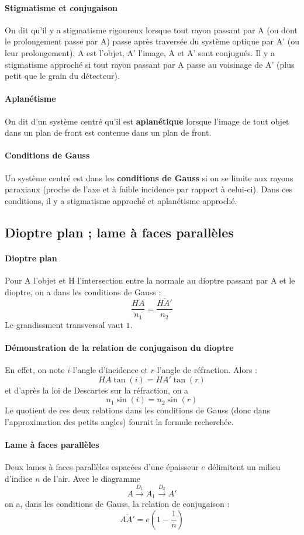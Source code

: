 \documentclass[french]{book}
\theoremstyle{plain}
\theoremstyle{definition}
\theoremstyle{remark}
\begin{document}
\paragraph{Stigmatisme et conjugaison}
On dit qu'il y a stigmatisme rigoureux lorsque tout rayon passant par A (ou dont le prolongement passe par A) passe après traversée du système optique par A' (ou leur prolongement). A est l’objet, A' l’image, A et A' sont conjugués. Il y a stigmatisme approché si tout rayon passant par A passe au voisinage de A' (plus petit que le grain du détecteur).
\paragraph{Aplanétisme} On dit d'un système centré qu'il est \textbf{aplanétique} lorsque l'image de tout objet dans un plan de front est contenue dans un plan de front.
\paragraph{Conditions de Gauss} Un système centré est dans les \textbf{conditions de Gauss} si on se limite aux rayons paraxiaux (proche de l’axe et à faible incidence par rapport à celui-ci). Dans ces conditions, il y a stigmatisme approché et aplanétisme approché.
\subsection{Dioptre plan ; lame à faces parallèles}
\paragraph{Dioptre plan} Pour A l’objet et H l’intersection entre la normale au dioptre passant par A et le dioptre, on a dans les conditions de Gauss : $$\frac{\overline{HA}}{n_1}=\frac{\overline{HA'}}{n_2}$$ Le grandissment transversal vaut $1$.
\paragraph{Démonstration de la relation de conjugaison du dioptre} En effet, on note $i$ l'angle d'incidence et $r$ l'angle de réfraction. Alors : $$HA\tan(i)=HA'\tan(r)$$ et d'après la loi de Descartes sur la réfraction, on a $$n_1\sin(i)=n_2\sin(r)$$ Le quotient de ces deux relations dans les conditions de Gauss (donc dans l'approximation des petits angles) fournit la formule recherchée.
\paragraph{Lame à faces parallèles} Deux lames à faces parallèles espacées d'une épaisseur $e$ délimitent un milieu d'indice $n$ de l'air. Avec le diagramme $$A\overset{D_1}{\longrightarrow}A_1\overset{D_2}{\longrightarrow}A'$$ on a, dans les conditions de Gauss, la relation de conjugaison : $$\overline{AA'}=e\left(1-\frac{1}{n}\right)$$
\end{document}
